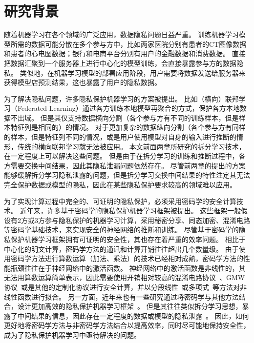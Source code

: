 \section{研究背景}
随着机器学习在各个领域的广泛应用，数据隐私问题日益严重。
%
训练机器学习模型所需的数据可能分散在多个参与方中，比如两家医院分别有患者的CT图像数据和患者的心电图数据；银行和电商平台分别有用户的金融数据和消费数据。
%
直接把数据汇聚到一个服务器上进行中心化的模型训练，会直接暴露参与方的数据隐私。
%
类似地，在机器学习模型的部署应用阶段，用户需要将数据发送给服务器来获得模型店预测结果，这也暴露了用户的隐私数据。

%
为了解决隐私问题，许多隐私保护机器学习的方案被提出。
%
比如（横向）联邦学习（Federated Learning）通过各方训练本地模型再聚合的方式，保护各方本地数据不出域。
但是其仅支持数据横向分割（各个参与方有不同的训练样本，但是样本特征列是相同的）的情况。
%
对于更加复杂的数据纵向分割（各个参与方有同样的样本，但是特征列不同的情况，或是用户使用模型对自身的输入进行推断的情形，传统的横向联邦学习就无法被应用。
%
本文前面两章所研究的拆分学习技术，在一定程度上可以解决这些问题。
但是由于在拆分学习的训练和推断过程中，各方需要交换中间结果，因此其隐私泄漏问题依然存在。
尽管前两章的提出的方案能够缓解拆分学习隐私泄露的问题，但是拆分学习交换中间结果的特性注定其无法完全保护数据或模型的隐私，因此在某些隐私保护要求较高的领域难以应用。

为了实现计算过程中完全的、可证明的隐私保护，必须采用密码学的安全计算技术。
%
近年来，许多基于密码学的隐私保护机器学习框架被提出。
%
这些框架一般假设有2方或3方参与隐私保护的机器学习计算，采用秘密分享、同态加密、混淆电路等密码学基础技术，来实现安全的神经网络的推断和训练。
%
尽管基于密码学的隐私保护机器学习框架拥有可证明的安全性，其也存在着严重的效率问题。
相比于中心化的明文计算，密码学方法的通讯和计算开销往往超出几个数量级。
%
由于使用密码学方法进行算数运算（加法、乘法）的技术已经相对成熟，密码学方法的性能瓶颈往往在于神经网络中的激活函数。
%
神经网络中的激活函数是非线性的，其无法用算数运算简单表示，因此需要使用开销相对较高的混淆电路协议~\cite{yao1986gc}、GMW协议~\cite{}或是其他的定制化协议进行安全计算，并以分段线性~\cite{mohassel2017secureml}或多项式~\cite{}等方法对非线性函数进行拟合。
%
另一方面，近年来也有一些研究通过将密码学与其他方法结合，设计更加高效的隐私保护机器学习框架~\cite{zhangqiao_2018_gelu_net,xiepeichen_2019_bayhenn,zhou_2022_codesign}。
%
但是其往往类似拆分学习思想，暴露了中间结果的信息，因此存在一定程度的数据或模型的隐私泄露~\cite{wong_2020_lwe_model,abuadbba2020can_split,hezecheng_2019_model_inversion_attack}。
%
因此，如何更好地将密码学方法与非密码学方法结合以提高效率，同时尽可能地保持安全性，成为了隐私保护机器学习中亟待解决的问题。
